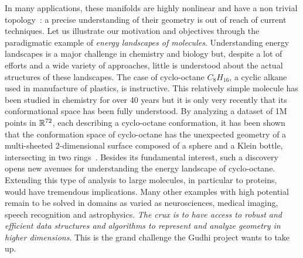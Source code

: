
In many applications, these manifolds are highly nonlinear and have a non trivial topology~:
a precise understanding of their geometry is out of reach of current techniques.
Let us illustrate our motivation and objectives through the paradigmatic example of {\em energy landscapes of molecules}. Understanding  energy landscapes is a major challenge in chemistry and biology but,  despite a lot of efforts and a wide variety of approaches, little is understood about the actual structures of these landscapes. The case of cyclo-octane $C_8H_{16}$, a cyclic alkane used in manufacture of plastics, is instructive. This relatively simple molecule has been studied in chemistry for over 40 years but it is only very recently that its conformational space has been fully understood. By analyzing a dataset of 1M points in $\mathbb R^{72}$, each describing a cyclo-octane conformation, it has been shown that the conformation space of cyclo-octane has the unexpected geometry of  a multi-sheeted 2-dimensional surface composed of a sphere and a Klein bottle, intersecting in two rings~\cite{mtcw-tco-2010}.  Besides its fundamental interest, such a discovery opens new avenues for understanding the energy landscape of cyclo-octane. Extending this type of analysis to large molecules, in particular to proteins, would have tremendous implications. Many other examples with high potential remain to be solved in domains as varied as neurosciences, medical imaging, speech recognition and astrophysics. {\em The crux is to have access to robust and efficient data structures and algorithms to represent and analyze geometry in higher dimensions}. This is the grand challenge the Gudhi project wants to take up.

